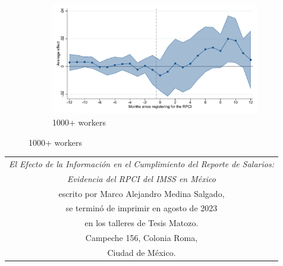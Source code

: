 \begin{figure}[H]
    \begin{subfigure}{0.32\textwidth}
    \caption{1000+ workers}
    \includegraphics[width=\textwidth]{04_Figures/muestra_10porciento/event_study_log_sal_cierre_size_1001_dcdh_connected.pdf}
    \end{subfigure}
    
\end{figure}



%
%
%

%

\newpage
\thispagestyle{empty}
\begin{table}[p]
\centering
\small
\label{ed}
\begin{tabular}{c}
\textit{El Efecto de la Información en el Cumplimiento del Reporte de Salarios:} \\ \textit{Evidencia del RPCI del IMSS en México} \\ escrito por Marco Alejandro Medina Salgado,\\ se terminó de imprimir en agosto de 2023\\ en los talleres de Tesis Matozo. \\ Campeche 156, Colonia Roma,\\ Ciudad de México.
\end{tabular}
\end{table}


% 